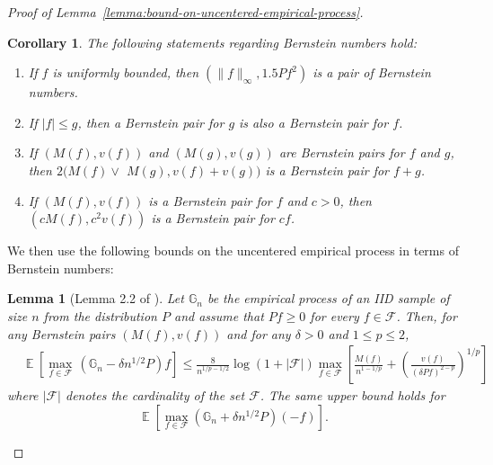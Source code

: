 \documentclass[12pt]{article}
\DeclareMathOperator*{\E}{\mathbb{E}}
\newtheorem{lemma}[theorem]{Lemma}
\newtheorem{corollary}[theorem]{Corollary}
\begin{document}
\begin{appendices}
\begin{proof}[Proof of Lemma~\ref{lemma:bound-on-uncentered-empirical-process}]
\begin{corollary}\label{cor:bernstein-properties} The following statements regarding Bernstein numbers hold:
\begin{enumerate}
\item[(i)]If $f$ is uniformly bounded, then $\left(\|f\|_{\infty}, 1.5 P f^2\right)$ is a pair of Bernstein numbers.
\item[(ii)] If $|f| \leq g$, then a Bernstein pair for $g$ is also a Bernstein pair for $f$.
\item[(iii)]If $(M(f), v(f))$ and $(M(g), v(g))$ are Bernstein pairs for $f$ and $g$, then $2(M(f) \vee$ $M(g), v(f)+v(g))$ is a Bernstein pair for $f+g$.
\item[(iv)]If $(M(f), v(f))$ is a Bernstein pair for $f$ and $c>0$, then $\left(c M(f), c^2 v(f)\right)$ is a Bernstein pair for $c f$. \end{enumerate}
\end{corollary} 
We then use the following bounds on the uncentered empirical process in terms of Bernstein numbers:
\begin{lemma}[Lemma 2.2 of \cite{vaart2006oracle}]\label{lemma:sup-Gn-bernstein}
	Let $\mathbb{G}_n$ be the empirical process of an IID sample of size $n$ from the distribution $P$ and assume that $P f \geq 0$ for every $f \in \mathcal{F}$. Then, for any Bernstein pairs $(M(f), v(f))$ and for any $\delta>0$ and $1 \leq p \leq 2$,
	\begin{align}
		&\E\left[\max_{f \in \mathcal{F}}\, (\mathbb{G}_n-\delta n^{1/2} P)f\right] \le \frac{8}{n^{1 / p-1 / 2}} \log (1+|\mathcal{F}|)\max_{f \in \mathcal{F}}\left[\frac{M(f)}{n^{1-1 / p}}+\left(\frac{v(f)}{(\delta P f)^{2-p}}\right)^{1 / p}\right]\nonumber
	\end{align}
	where $|\mathcal{F}|$ denotes the cardinality of the set $\mathcal{F}$. The same upper bound holds for \[\E\left[\max_{f \in \mathcal{F}}(\mathbb{G}_n+\delta n^{1/2} P)(-f)\right].\]
\end{lemma}


\end{proof}
\end{appendices}
\end{document}
